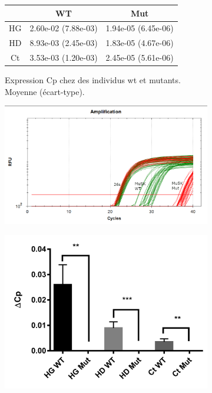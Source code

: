 	\begin{figure}[h]
		\begin{center}
			\begin{subfigure}[h]{0.49\textwidth}
				\footnotesize{
					\caption{Expression \textDelta{}Cp chez des individus \gls{wt} et mutants. Moyenne (écart-type).}
					\label{fig:TableAmpli}
					\begin{tabular}{c | c c}
						\hline
							&WT						&Mut\\
						\hline
						HG 	&2.60e-02 (7.88e-03)	&1.94e-05 (6.45e-06) \\
						HD 	&8.93e-03 (2.45e-03)	&1.83e-05 (4.67e-06) \\
						Ct	&3.53e-03 (1.20e-03)	&2.45e-05 (5.61e-06) \\				
					\end{tabular}
				}
			\end{subfigure}
			\begin{subfigure}[h]{0.49\textwidth}
				\caption{}
				\label{fig:AmpliqPCR}
				\includegraphics[width=\textwidth]{./Images/qPCR/Amplification.jpg}
			\end{subfigure}
			\begin{subfigure}[h]{0.329\textwidth}
				\caption{}
				\label{fig:qPCRCompaWTMut}
				\includegraphics[width=\textwidth]{./Images/qPCR/Comp_WT-Mut.jpg}

\end{subfigure}
\end{center}
\end{figure}
